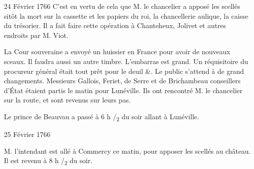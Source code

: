 \begin{diary}{24 Février 1766}{}
                         C'est en vertu de cela que M. le chancelier a apposé
                           les scellés sitôt la mort sur la cassette et
                           les papiers du roi,
                              la chancellerie aulique,
                           la caisse du trésorier.
                           Il a fait faire cette
                           opération à Chanteheux, Jolivet et autres
                           endroits par M. Viot.
                        \bigskip



                           La Cour souveraine a envoyé un huissier en
                           France pour avoir de nouveaux
                           sceaux.
                           Il faudra aussi un autre timbre. L'embarras
                           est grand. Un réquisitoire du procureur général était
                           tout prêt pour le deuil \&. Le public
                           s'attend à de grand changements. Messieurs
                           Gallois, Feriet,
                              de Serre et de Brichambeau
                           conseillers d’État étaient partis le matin pour
                           Lunéville. Ils ont
                           rencontré M. le
                              chancelier sur la route, et sont revenus
                           sur leurs pas. \bigskip



                           Le prince de Beauvau a passé à 6 h
                              /\textsubscript{2} du
                           soir allant à Lunéville.
                        \bigskip


                     \end{diary}

                     \begin{diary}{25 Février 1766}{}


                           M. l'intendant est allé à
                              Commercy
                           ce matin, pour apposer les scellés au château.
                           Il est revenu à 8 h /\textsubscript{2} du
                           soir. \bigskip


                     \end{diary}

